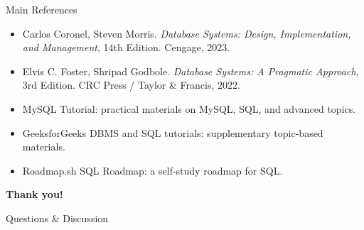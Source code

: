 \documentclass[aspectratio=169,11pt]{beamer}
\begin{document}
\begin{frame}{Main References}
\begin{itemize}
  \item Carlos Coronel, Steven Morris. \textit{Database Systems: Design, Implementation, and Management}, 14th Edition. Cengage, 2023.
  \item Elvis C. Foster, Shripad Godbole. \textit{Database Systems: A Pragmatic Approach}, 3rd Edition. CRC Press / Taylor \& Francis, 2022.
  \item MySQL Tutorial: practical materials on MySQL, SQL, and advanced topics.
  \item GeeksforGeeks DBMS and SQL tutorials: supplementary topic-based materials.
  \item Roadmap.sh SQL Roadmap: a self-study roadmap for SQL.
\end{itemize}
\end{frame}

\begin{frame}
\centering
\Huge \textbf{Thank you!}

\vspace{1em}
\Large Questions \& Discussion
\end{frame}
\end{document}
